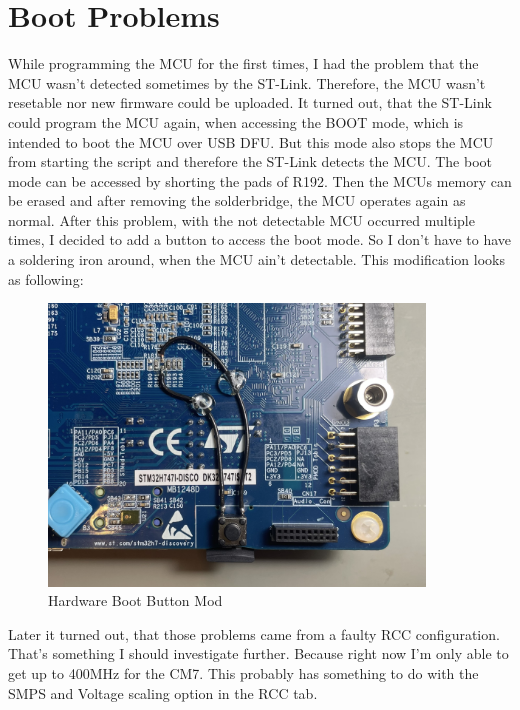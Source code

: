 \section{Boot Problems}
While programming the MCU for the first times, I had the problem that the MCU wasn't detected sometimes by the ST-Link. Therefore, the MCU wasn't resetable nor new firmware could be uploaded. It turned out, that the ST-Link could program the MCU again, when accessing the BOOT mode, which is intended to boot the MCU over USB DFU. But this mode also stops the MCU from starting the script and therefore the ST-Link detects the MCU. The boot mode can be accessed by shorting the pads of R192. Then the MCUs memory can be erased and after removing the solderbridge, the MCU operates again as normal. After this problem, with the not detectable MCU occurred multiple times, I decided to add a button to access the boot mode. So I don't have to have a soldering iron around, when the MCU ain't detectable. This modification looks as following:

\begin{figure}[H]
	\centering
	\includegraphics[width=10cm]{Resources/HW_Boot_MOD.JPEG}
	\caption{Hardware Boot Button Mod}
	\label{fig:Hardware Boot Button Mod}
\end{figure}

Later it turned out, that those problems came from a faulty RCC configuration. That's something I should investigate further. Because right now I'm only able to get up to 400MHz for the CM7. This probably has something to do with the SMPS and Voltage scaling option in the RCC tab.
